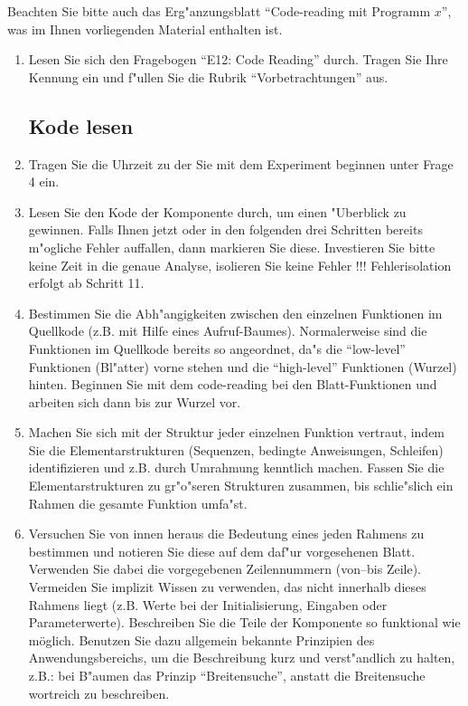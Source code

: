 Beachten Sie bitte auch das Erg"anzungsblatt "`Code-reading mit Programm $x$"',
was im Ihnen vorliegenden Material enthalten ist.

\begin{enumerate}

\item Lesen Sie sich den Fragebogen "`E12: Code Reading"' durch.
Tragen Sie Ihre Kennung ein und f"ullen Sie die Rubrik
"`Vorbetrachtungen"' aus. 

\subsection*{Kode lesen}

\item Tragen Sie die Uhrzeit zu der Sie mit dem Experiment beginnen 
unter Frage 4 ein.

\item Lesen Sie den Kode der Komponente durch, um einen "Uberblick zu
gewinnen. Falls Ihnen jetzt oder in
den folgenden drei Schritten bereits m"ogliche Fehler auffallen, dann 
markieren Sie diese. Investieren Sie bitte keine Zeit in die
genaue Analyse, isolieren Sie keine Fehler !!! 
Fehlerisolation erfolgt ab Schritt 11.

\item Bestimmen Sie die Abh"angigkeiten zwischen den einzelnen Funktionen im
Quellkode (z.B. mit Hilfe eines Aufruf-Baumes). Normalerweise sind die
Funktionen im Quellkode bereits so angeordnet, da"s die "`low-level"'
Funktionen (Bl"atter) vorne stehen und die "`high-level"' Funktionen (Wurzel)
hinten. Beginnen Sie mit dem code-reading bei den Blatt-Funktionen und 
arbeiten sich dann bis zur Wurzel vor.

\item  Machen Sie sich mit der Struktur jeder einzelnen Funktion vertraut, 
indem Sie
die Elementarstrukturen (Sequenzen, bedingte Anweisungen, Schleifen) 
identifizieren und z.B. durch
Umrahmung kenntlich machen. Fassen Sie die Elementarstrukturen zu
gr"o"seren Strukturen zusammen, bis schlie"slich ein Rahmen die gesamte 
Funktion umfa"st.

\item	Versuchen Sie von innen heraus die Bedeutung eines jeden
Rahmens zu bestimmen und notieren Sie diese auf dem daf"ur vorgesehenen Blatt.
Verwenden Sie dabei die vorgegebenen Zeilennummern (von--bis Zeile). 
Vermeiden Sie implizit
Wissen zu verwenden, das nicht innerhalb dieses Rahmens liegt (z.B.
Werte bei der Initialisierung, Eingaben oder Parameterwerte).
Beschreiben Sie die Teile der Komponente so funktional wie m\"oglich.
Benutzen Sie dazu allgemein bekannte Prinzipien des Anwendungsbereichs, um
die Beschreibung kurz und verst"andlich zu halten, z.B.: bei B"aumen das
Prinzip "`Breitensuche"', anstatt die Breitensuche wortreich zu beschreiben.


\end{enumerate}

